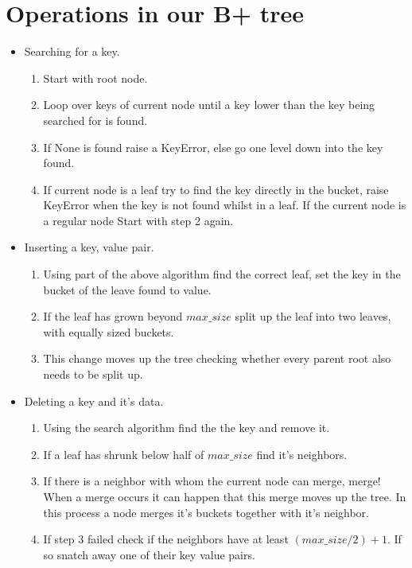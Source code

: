\documentclass{article}
\begin{document}
\section*{Operations in our B+ tree}
\begin{itemize}
    \item Searching for a key.
    \begin{enumerate}
        \item Start with root node.
        \item Loop over keys of current node until a key lower than the key
        being searched for is found.
        \item If None is found raise a KeyError, else go one level down into
        the key found.
        \item If current node is a leaf try to find the key directly in the
        bucket, raise KeyError when the key is not found whilst in a leaf.
        If the current node is a regular node Start with step 2 again.
    \end{enumerate}
    \item Inserting a key, value pair.
    \begin{enumerate}
        \item Using part of the above algorithm find the correct leaf, set the
        key in the bucket of the leave found to value.
        \item If the leaf has grown beyond $max\_size$ split up the leaf into two
        leaves, with equally sized buckets.
        \item This change moves up the tree checking whether every parent root
        also needs to be split up.
    \end{enumerate}
    \item Deleting a key and it's data.
    \begin{enumerate}
        \item Using the search algorithm find the the key and remove it.
        \item If a leaf has shrunk below half of $max\_size$ find it's
        neighbors.
        \item If there is a neighbor with whom the current node can merge,
        merge! When a merge occurs it can happen that this merge moves up the
        tree. In this process a node merges it's buckets together with it's
        neighbor.
        \item If step 3 failed check if the neighbors have at least
        $(max\_size/2) + 1$. If so snatch away one of their key value pairs.

    \end{enumerate}
\end{itemize}
\end{document}
